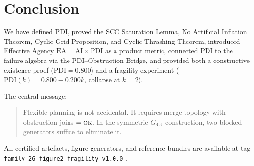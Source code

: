 \documentclass[11pt,letterpaper]{article}
\theoremstyle{plain}
\theoremstyle{definition}
\theoremstyle{remark}
\newcommand{\PDI}{\mathrm{PDI}}
\newcommand{\AI}{\mathrm{AI}}
\newcommand{\EA}{\mathrm{EA}}
\newcommand{\OK}{\textup{\textsc{ok}}}
\begin{document}
\section{Conclusion}

We have defined $\PDI$, proved the SCC Saturation Lemma,
No Artificial Inflation Theorem, Cyclic Grid Proposition, and Cyclic Thrashing
Theorem, introduced Effective Agency $\EA = \AI \times \PDI$ as a product
metric, connected $\PDI$ to the failure algebra via the PDI--Obstruction Bridge,
and provided both a constructive existence proof ($\PDI = 0.800$)
and a fragility experiment ($\PDI(k) = 0.800 - 0.200k$, collapse at $k=2$).

The central message:
\begin{quote}
  Flexible planning is not accidental.
  It requires merge topology with obstruction joins $= \OK$.
  In the symmetric $G_{4,6}$ construction, two blocked generators
  suffice to eliminate it.
\end{quote}

All certified artefacts, figure generators, and reference bundles are
available at tag \texttt{family-26-figure2-fragility-v1.0.0}
\cite{QAFamily26Cert}.



\end{document}
